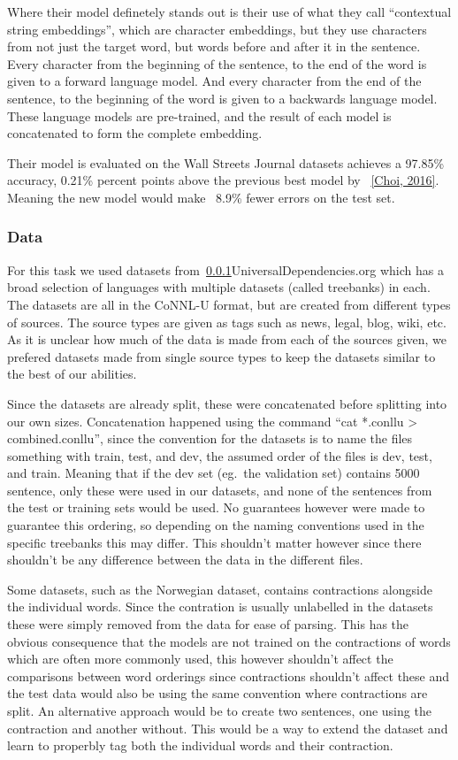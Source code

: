 Where their model definetely stands out is their use of what they call
``contextual string embeddings'', which are character embeddings, but they use
characters from not just the target word, but words before and after it in the
sentence. Every character from the beginning of the sentence, to the end of the
word is given to a forward language model. And every character from the end of
the sentence, to the beginning of the word is given to a backwards language
model. These language models are pre-trained, and the result of each model is
concatenated to form the complete embedding. 

Their model is evaluated on the Wall Streets Journal datasets achieves a
97.85\% accuracy, 0.21\% percent points above the previous best model by
~\ref{Choi, 2016}. Meaning the new model would make ~8.9\% fewer errors on the
test set.

\subsubsection{Data}

For this task we used datasets from~\ref{}{UniversalDependencies.org} which has
a broad selection of languages with multiple datasets (called treebanks) in
each. The datasets are all in the CoNNL-U format, but are created from different
types of sources. The source types are given as tags such as news, legal, blog,
wiki, etc. As it is unclear how much of the data is made from each of the
sources given, we prefered datasets made from single source types to keep the
datasets similar to the best of our abilities.

Since the datasets are already split, these were concatenated before splitting
into our own sizes. Concatenation happened using the command ``cat *.conllu >
combined.conllu'', since the convention for the datasets is to name the files
something with train, test, and dev, the assumed order of the files is dev,
test, and train. Meaning that if the dev set (eg.\ the validation set) contains
5000 sentence, only these were used in our datasets, and none of the sentences
from the test or training sets would be used. No guarantees however were made to
guarantee this ordering, so depending on the naming conventions used in the
specific treebanks this may differ. This shouldn't matter however since there
shouldn't be any difference between the data in the different files.

Some datasets, such as the Norwegian dataset, contains contractions alongside
the individual words. Since the contration is usually unlabelled in the datasets
these were simply removed from the data for ease of parsing. This has the
obvious consequence that the models are not trained on the contractions of words
which are often more commonly used, this however shouldn't affect the
comparisons between word orderings since contractions shouldn't affect these and
the test data would also be using the same convention where contractions are
split. An alternative approach would be to create two sentences, one using the
contraction and another without. This would be a way to extend the dataset and
learn to properbly tag both the individual words and their contraction.

